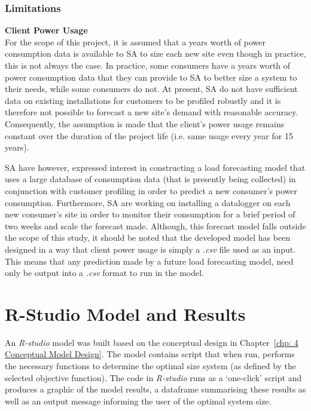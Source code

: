 \documentclass[a4paper,11pt,fleqn]{report}
\begin{document}
\subsection{Limitations}

\noindent\textbf{Client Power Usage}\\
For the scope of this project, it is assumed that a years worth of power consumption data is available to \ac{SA} to size each new site even though in practice, this is not always the case. In practice, some consumers have a years worth of power consumption data that they can provide to \ac{SA} to better size a system to their needs, while some consumers do not. At present,  \ac{SA} do not have sufficient data on existing installations for customers to be profiled robustly and it is therefore not possible to forecast a new site's demand with reasonable accuracy. Consequently, the assumption is made that the client's power usage remains constant over the duration of the project life (i.e. same usage every year for 15 years).

\ac{SA} have however, expressed interest in constructing a load forecasting model that uses a large database of consumption data (that is presently being collected) in conjunction with customer profiling in order to predict a new consumer's power consumption. Furthermore, \ac{SA} are working on installing a datalogger on each new consumer's site in order to monitor their consumption for a brief period of two weeks and scale the forecast made. Although, this forecast model falls outside the scope of this study, it should be noted that the developed model has been designed in a way that client power usage is simply a \textit{.csv} file used as an input. This means that any prediction made by a future load forecasting model, need only be output into a \textit{.csv} format to run in the model.



\chapter{R-Studio Model and Results} \label{chp: 5 Results}
An \textit{R-studio} model was built based on the conceptual design in Chapter~\ref{chp: 4 Conceptual Model Design}. The model contains script that when run, performs the necessary functions to determine the optimal size system (as defined by the selected objective function). The code in \textit{R-studio} runs as a `one-click' script and produces a graphic of the model results, a dataframe summarising these results as well as an output message informing the user of the optimal system size.
\end{document}
